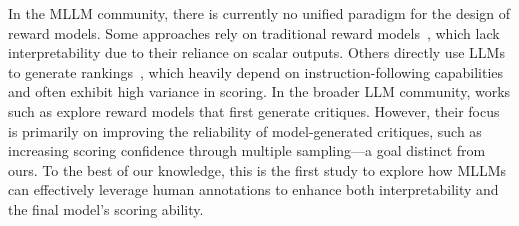 In the MLLM community, there is currently no unified paradigm for the design of reward models. Some approaches rely on traditional reward models~\cite{sun2023aligning}, which lack interpretability due to their reliance on scalar outputs. Others directly use LLMs to generate rankings~\cite{xiong2024llava}, which heavily depend on instruction-following capabilities and often exhibit high variance in scoring. In the broader LLM community, works such as \cite{yu2024self} explore reward models that first generate critiques. However, their focus is primarily on improving the reliability of model-generated critiques, such as increasing scoring confidence through multiple sampling—a goal distinct from ours. To the best of our knowledge, this is the first study to explore how MLLMs can effectively leverage human annotations to enhance both interpretability and the final model's scoring ability.

